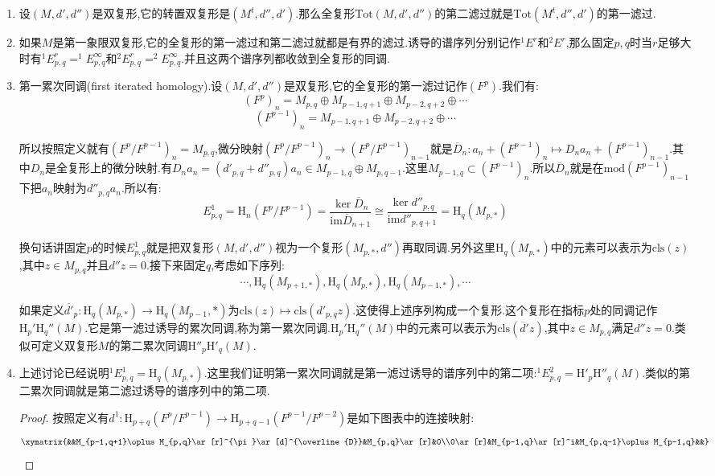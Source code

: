 \begin{enumerate}
	\item 设$(M,d',d'')$是双复形,它的转置双复形是$(M^t,d'',d')$.那么全复形$\mathrm{Tot}(M,d',d'')$的第二滤过就是$\mathrm{Tot}(M^t,d'',d')$的第一滤过.
	\item 如果$M$是第一象限双复形,它的全复形的第一滤过和第二滤过就都是有界的滤过.诱导的谱序列分别记作$^1E^r$和$^2E^r$,那么固定$p,q$时当$r$足够大时有$^1E_{p,q}^r=^1E_{p,q}^{\infty}$和$^2E_{p,q}^r=^2E_{p,q}^{\infty}$.并且这两个谱序列都收敛到全复形的同调.
	\item 第一累次同调(first iterated homology).设$(M,d',d'')$是双复形,它的全复形的第一滤过记作$(F^p)$.我们有:
	$$(F^p)_n=M_{p,q}\oplus M_{p-1,q+1}\oplus M_{p-2,q+2}\oplus\cdots$$
	$$(F^{p-1})_n=M_{p-1,q+1}\oplus M_{p-2,q+2}\oplus\cdots$$
	
	所以按照定义就有$(F^p/F^{p-1})_n=M_{p,q}$,微分映射$(F^p/F^{p-1})_n\to(F^p/F^{p-1})_{n-1}$就是$\overline{D}_n:a_n+(F^{p-1})_n\mapsto D_na_n+(F^{p-1})_{n-1}$.其中$D_n$是全复形上的微分映射.有$D_na_n=(d'_{p,q}+d''_{p,q})a_n\in M_{p-1,q}\oplus M_{p,q-1}$.这里$M_{p-1,q}\subset(F^{p-1})_n$.所以$\overline{D}_n$就是在$\mathrm{mod}(F^{p-1})_{n-1}$下把$a_n$映射为$d''_{p,q}a_n$.所以有:
	$$E_{p,q}^1=\mathrm{H}_n(F^p/F^{p-1})=\frac{\ker\overline{D}_n}{\mathrm{im}\overline{D}_{n+1}}\cong\frac{\ker d''_{p,q}}{\mathrm{im}d''_{p,q+1}}=\mathrm{H}_q(M_{p,*})$$
	
	换句话讲固定$p$的时候$E_{p,q}^1$就是把双复形$(M,d',d'')$视为一个复形$(M_{p,*},d'')$再取同调.另外这里$\mathrm{H}_q(M_{p,*})$中的元素可以表示为$\mathrm{cls}(z)$,其中$z\in M_{p,q}$并且$d''z=0$.接下来固定$q$,考虑如下序列:
	$$\cdots,\mathrm{H}_q(M_{p+1,*}),\mathrm{H}_q(M_{p,*}),\mathrm{H}_q(M_{p-1,*}),\cdots$$
	
	如果定义$\overline{d'}_p:\mathrm{H}_q(M_{p,*})\to\mathrm{H}_q(M_{p-1},*)$为$\mathrm{cls}(z)\mapsto\mathrm{cls}(d'_{p,q}z)$.这使得上述序列构成一个复形.这个复形在指标$p$处的同调记作$\mathrm{H}_p'\mathrm{H}_q''(M)$.它是第一滤过诱导的累次同调,称为第一累次同调.$\mathrm{H}_p'\mathrm{H}_q''(M)$中的元素可以表示为$\mathrm{cls}(\overline{d}'z)$,其中$z\in M_{p,q}$满足$d''z=0$.类似可定义双复形$M$的第二累次同调$\mathrm{H}''_p\mathrm{H}'_q(M)$.
	\item 上述讨论已经说明$^1E_{p,q}^1=\mathrm{H}_q(M_{p,*})$.这里我们证明第一累次同调就是第一滤过诱导的谱序列中的第二项:$^1E_{p,q}^2=\mathrm{H}'_p\mathrm{H}''_q(M)$.类似的第二累次同调就是第二滤过诱导的谱序列中的第二项.
	\begin{proof}
		
		按照定义有$d^1:\mathrm{H}_{p+q}(F^p/F^{p-1})\to\mathrm{H}_{p+q-1}(F^{p-1}/F^{p-2})$是如下图表中的连接映射:
		$$\xymatrix{&&M_{p-1,q+1}\oplus M_{p,q}\ar[r]^{\pi}\ar[d]^{\overline{D}}&M_{p,q}\ar[r]&0\\0\ar[r]&M_{p-1,q}\ar[r]^i&M_{p,q-1}\oplus M_{p-1,q}&&}$$
		

\end{proof}
\end{enumerate}

